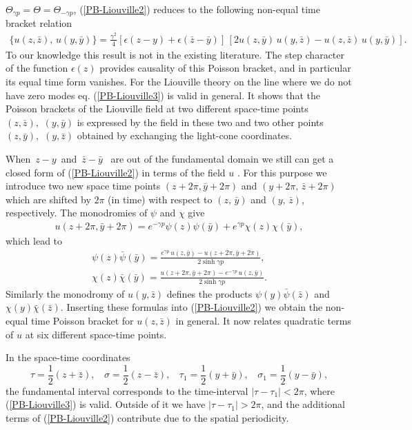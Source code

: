 \documentclass[a4paper,12pt]{article}
\begin{document}
$\Theta_{\gamma p}=\Theta=\Theta_{-\gamma p}$, (\ref{PB-Liouville2})
reduces to the following non-equal time bracket relation
\begin{eqnarray}\label{PB-Liouville3}
\{u(z, \bar z),\, u(y, \bar y)\}=
\frac{\gamma^2}{4}[\epsilon(z-y)+\epsilon(\bar z-\bar y)]
\,[2u(z, \bar y)\, u(y, \bar z) -u(z, \bar z)\, u(y, \bar y)].
\end{eqnarray}
To our knowledge this result is not in the existing
literature. The step character of the function $\epsilon (z)$
provides causality of this Poisson bracket, and in particular its
equal time form vanishes.  For the Liouville theory on
the line where we do not have zero modes eq. (\ref{PB-Liouville3})
is valid in general.  It shows that the Poisson
brackets of the Liouville field at two different space-time points
$(z,\bar z),\,\,(y,\bar y)$ is expressed by the field in
these two and two other points $(z,\bar y),\,\,(y,\bar z)$ obtained by
exchanging the light-cone coordinates.

\noindent
When \,$ z-y$\, and \,$\bar z-\bar y$ \, are out of the
fundamental domain we still can get a closed form of
(\ref{PB-Liouville2}) in terms of the field $u$ .  For this purpose we
introduce two new space time points $(z +2\pi, \bar y +2\pi)$ and $(y
+2\pi,\, \bar z +2\pi)$ which are shifted by $2\pi$ (in time) with
respect to $(z,\,\bar y )$ and $(y,\, \bar z)$, respectively.  The
monodromies of $\psi$ and $\chi$ give
\begin{eqnarray}\label{Mon-u1}
u(z +2\pi, \bar y +2\pi)=e^{-\gamma p}\psi(z)\psi(\bar y)
+e^{\gamma p}\chi(z)\chi(\bar y),
\end{eqnarray}
which lead to
\begin{eqnarray}\label{z-bary}
\psi(z)\bar \psi(\bar y)=\frac{e^{\gamma p}\,u(z, \bar y)-
u(z +2\pi, \bar y +2\pi)}
{2\sinh \gamma p},\nonumber \\
\chi(z)\bar \chi(\bar y)=\frac{u(z +2\pi, \bar y +2\pi)
-e^{-\gamma p}\,u(z, \bar y)}
{2\sinh \gamma p}.
\end{eqnarray}
Similarly the monodromy of $u(y, \bar z)$ defines the products
$\psi(y)\bar \psi(\bar z)$ and $\chi(y)\bar \chi(\bar z)$. Inserting
these formulas into (\ref{PB-Liouville2}) we obtain the
non-equal time Poisson bracket for
$u(z, \bar z)$ in general. It now relates quadratic terms of $u$ at six
different space-time points.

\noindent
In the space-time coordinates
\begin{equation}\label{t,sigma}
\tau =\frac{1}{2}(z+\bar z),~~~~\sigma =\frac{1}{2}(z-\bar z),~~~~
\tau_1 =\frac{1}{2}(y+\bar y),~~~~\sigma_1 =\frac{1}{2}(y-\bar y),
\end{equation}
the fundamental interval corresponds to the time-interval
$|\tau-\tau_1|<2\pi$, where (\ref{PB-Liouville3}) is valid.
Outside of it we have $|\tau-\tau_1|>2\pi$, and the additional
terms of (\ref{PB-Liouville2}) contribute due to the
spatial periodicity.
\end{document}
